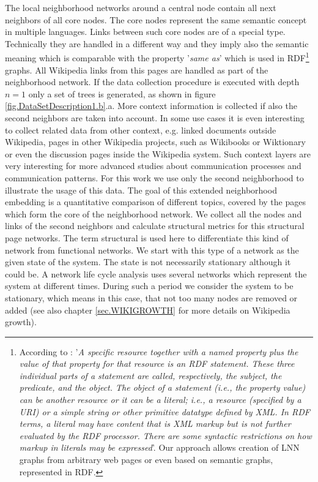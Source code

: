 \documentclass[a4paper,10pt]{scrbook}
\begin{document}
The local neighborhood networks around a central node contain all next neighbors of all core nodes. The core nodes represent the same semantic concept in multiple languages. Links between such core nodes are of a special type. Technically they are handled in a different way and they imply also the semantic meaning which is comparable with the property '\textit{same as}' which is used in RDF\footnote{According to \cite{Lassila1999}: '\textit{A specific resource together with a named property plus the value of that property for that resource is an RDF statement. These three individual parts of a statement are called, respectively, the subject, the predicate, and the object. The object of a statement (i.e., the property value) can be another resource or it can be a literal; i.e., a resource (specified by a URI) or a simple string or other primitive datatype defined by XML. In RDF terms, a literal may have content that is XML markup but is not further evaluated by the RDF processor. There are some syntactic restrictions on how markup in literals may be expressed}'. Our approach allows creation of LNN graphs from arbitrary web pages or even based on semantic graphs, represented in RDF.} graphs. 
All Wikipedia links from this pages are handled as part of the neighborhood network. If the data collection procedure is executed with depth $n=1$ only a set of trees is generated, as shown in figure \ref{fig.DataSetDescription1.b}.a. More context information is collected if also the second neighbors are taken into account. In some use cases it is even interesting to collect related data from other context, e.g. linked documents outside Wikipedia, pages in other Wikipedia projects, such as Wikibooks or Wiktionary or even the discussion pages inside the Wikipedia system. Such context layers are very interesting for more advanced studies about communication processes and communication patterns. For this work we use only the second neighborhood to illustrate the usage of this data. The goal of this extended neighborhood embedding is a quantitative comparison of different topics, covered by the pages which form the core of the neighborhood network. We collect all the nodes and links of the second neighbors and calculate structural metrics for this structural page networks. The term structural is used here to differentiate this kind of network from functional networks. We start with this type of a network as the given state of the system. The state is not necessarily stationary although it could be. A network life cycle analysis uses several networks which represent the system at different times. During such a period we consider the system to be stationary, which means in this case, that not too many nodes are removed or added (see also chapter \ref{sec.WIKIGROWTH} for more details on Wikipedia growth).
 
\end{document}
